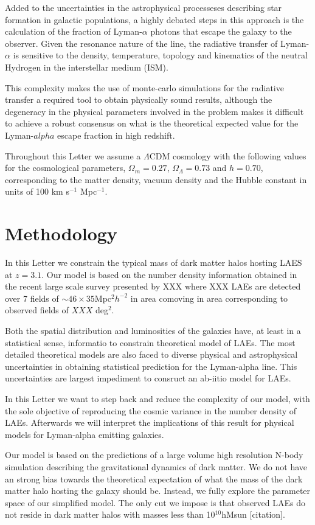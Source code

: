 \documentclass{emulateapj}
\begin{document}
Added to the uncertainties in the astrophysical processeses describing star formation in galactic populations, a highly debated steps in this approach is the calculation of the fraction of Lyman-$\alpha$ photons that escape the galaxy to the observer. Given the resonance nature of the line, the radiative transfer of Lyman-$\alpha$ is sensitive to the density, temperature, topology and kinematics of the neutral Hydrogen in the interstellar medium (ISM). 

This complexity makes the use of monte-carlo simulations for the radiative transfer a required tool to obtain physically sound results, although the degeneracy in the physical parameters involved in the problem makes it difficult to achieve a robust consensus on what is the theoretical expected value for the Lyman-$alpha$ escape fraction in high redshift.


Throughout this Letter we assume a $\Lambda$CDM cosmology with the following values for the cosmological parameters, $\Omega_{m}=0.27$, $\Omega_{\Lambda}=0.73$ and $h=0.70$, corresponding to the matter density, vacuum density and the Hubble constant in units of 100 km s$^{-1}$ Mpc$^{-1}$.

\section{Methodology}
In this Letter we constrain the typical mass of dark matter halos hosting LAES at $z=3.1$. Our model is based on the number density information obtained in the recent large scale survey presented by XXX where XXX LAEs are detected over 7 fields of $\sim 46 \times 35$Mpc$^{2}h^{-2}$ in area comoving in area corresponding to observed fields of $XXX$ deg$^{2}$. 

Both the spatial distribution and luminosities of the galaxies have, at least in a statistical sense, informatio to constrain theoretical model of LAEs. The most detailed theoretical models are also faced to diverse physical and astrophysical uncertainties in obtaining statistical prediction for the Lyman-alpha line. This uncertainties are largest impediment to consruct an ab-iitio model for LAEs. 

In this Letter we want to step back and reduce the complexity of our model, with the sole objective of reproducing the cosmic variance in the number density of LAEs. Afterwards we will interpret the implications of this result for physical models for Lyman-alpha emitting galaxies.

Our model is based on the predictions of a large volume high resolution N-body simulation describing the gravitational dynamics of dark matter. We do not have an strong bias towards the theoretical expectation of what the mass of the dark matter halo hosting the galaxy should be.  Instead, we fully explore the parameter space of our simplified model. The only cut we impose is that observed LAEs do not reside in dark matter halos with masses less than 10$^{10}$hMsun [citation]. 
\end{document}
